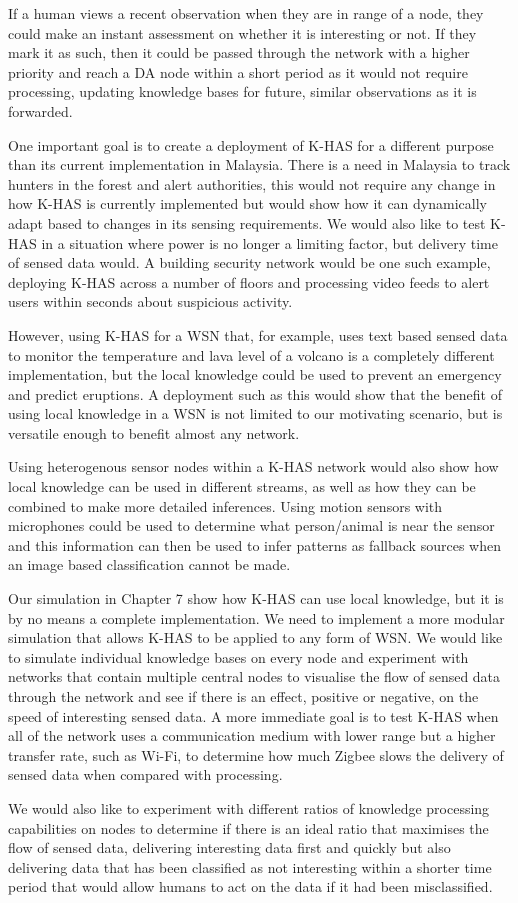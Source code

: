 If a human views a recent observation when they are in range of a node, they could make an instant assessment on whether it is interesting or not. If they mark it as such, then it could be passed through the network with a higher priority and reach a DA node within a short period as it would not require processing, updating knowledge bases for future, similar observations as it is forwarded.

One important goal is to create a deployment of K-HAS for a different purpose than its current implementation in Malaysia. There is a need in Malaysia to track hunters in the forest and alert authorities, this would not require any change in how K-HAS is currently implemented but would show how it can dynamically adapt based to changes in its sensing requirements. We would also like to test K-HAS in a situation where power is no longer a limiting factor, but delivery time of sensed data would. A building security network would be one such example, deploying K-HAS across a number of floors and processing video feeds to alert users within seconds about suspicious activity.

However, using K-HAS for a WSN that, for example, uses text based sensed data to monitor the temperature and lava level of a volcano is a completely different implementation, but the local knowledge could be used to prevent an emergency and predict eruptions. A deployment such as this would show that the benefit of using local knowledge in a WSN is not limited to our motivating scenario, but is versatile enough to benefit almost any network.

Using heterogenous sensor nodes within a K-HAS network would also show how local knowledge can be used in different streams, as well as how they can be combined to make more detailed inferences.  Using motion sensors with microphones could be used to determine what person/animal is near the sensor and this information can then be used to infer patterns as fallback sources when an image based classification cannot be made.

Our simulation in Chapter 7 show how K-HAS can use local knowledge, but it is by no means a complete implementation.  We need to implement a more modular simulation that allows K-HAS to be applied to any form of WSN. We would like to simulate individual knowledge bases on every node and experiment with networks that contain multiple central nodes to visualise the flow of sensed data through the network and see if there is an effect, positive or negative, on the speed of interesting sensed data. A more immediate goal is to test K-HAS when all of the network uses a communication medium with lower range but a higher transfer rate, such as Wi-Fi, to determine how much Zigbee slows the delivery of sensed data when compared with processing.

We would also like to experiment with different ratios of knowledge processing capabilities on nodes to determine if there is an ideal ratio that maximises the flow of sensed data, delivering interesting data first and quickly but also delivering data that has been classified as not interesting within a shorter time period that would allow humans to act on the data if it had been misclassified.